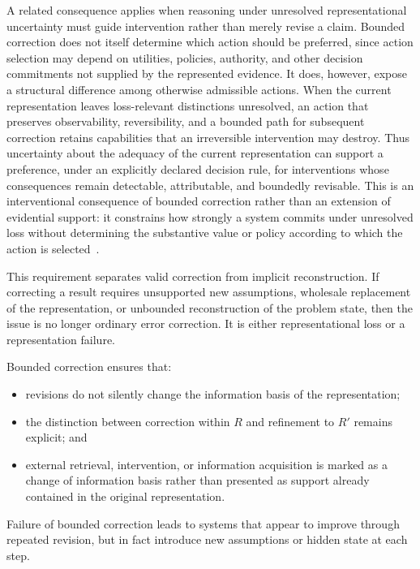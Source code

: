\documentclass[11pt]{article}
\theoremstyle{definition}
\theoremstyle{remark}
\begin{document}
A related consequence applies when reasoning under unresolved representational uncertainty must guide intervention rather than merely revise a claim. Bounded correction does not itself determine which action should be preferred, since action selection may depend on utilities, policies, authority, and other decision commitments not supplied by the represented evidence. It does, however, expose a structural difference among otherwise admissible actions. When the current representation leaves loss-relevant distinctions unresolved, an action that preserves observability, reversibility, and a bounded path for subsequent correction retains capabilities that an irreversible intervention may destroy. Thus uncertainty about the adequacy of the current representation can support a preference, under an explicitly declared decision rule, for interventions whose consequences remain detectable, attributable, and boundedly revisable. This is an interventional consequence of bounded correction rather than an extension of evidential support: it constrains how strongly a system commits under unresolved loss without determining the substantive value or policy according to which the action is selected~\cite{Fist2026}.

This requirement separates valid correction from implicit reconstruction. If correcting a result requires unsupported new assumptions, wholesale replacement of the representation, or unbounded reconstruction of the problem state, then the issue is no longer ordinary error correction. It is either representational loss or a representation failure.

Bounded correction ensures that:

\begin{itemize}[leftmargin=1.5em]
    \item revisions do not silently change the information basis of the representation;
    \item the distinction between correction within \(R\) and refinement to \(R'\) remains explicit; and
    \item external retrieval, intervention, or information acquisition is marked as a change of information basis rather than presented as support already contained in the original representation.
\end{itemize}

Failure of bounded correction leads to systems that appear to improve through repeated revision, but in fact introduce new assumptions or hidden state at each step.
\end{document}
